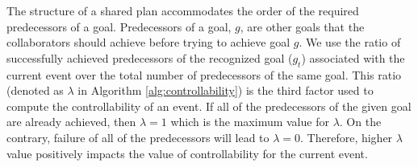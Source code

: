\documentclass{aamas2016}
\begin{document}
% 

The structure of a shared plan accommodates the order of the required
predecessors of a goal. Predecessors of a goal, $g$, are other goals that
the collaborators should achieve before trying to achieve goal $g$. We use the
ratio of successfully achieved predecessors of the recognized goal
($\mathit{g}_{t}$) associated with the current event over the total number of
predecessors of the same goal. This ratio (denoted as $\lambda$ in Algorithm
\ref{alg:controllability}) is the third factor used to compute the
controllability of an event. If all of the predecessors of the given goal are
already achieved, then $\lambda=1$ which is the maximum value for $\lambda$. On
the contrary, failure of all of the predecessors will lead to $\lambda=0$.
Therefore, higher $\lambda$ value positively impacts the value of
controllability for the current event.

% 
\end{document}
